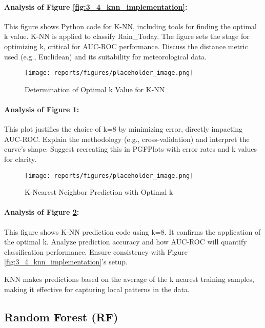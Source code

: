 \documentclass[12pt]{article}
\begin{document}
\paragraph{Analysis of Figure \ref{fig:3_4_knn_implementation}:}
This figure shows Python code for K-NN, including tools for finding the optimal k value. K-NN is applied to classify Rain\_Today. The figure sets the stage for optimizing k, critical for AUC-ROC performance. Discuss the distance metric used (e.g., Euclidean) and its suitability for meteorological data.

\begin{figure}[H]
    \centering
    \texttt{[image: reports/figures/placeholder\_image.png]} %
    \caption{Determination of Optimal k Value for K-NN}
    \label{fig:3_5_knn_optimal_k}
\end{figure}

\paragraph{Analysis of Figure \ref{fig:3_5_knn_optimal_k}:}
This plot justifies the choice of k=8 by minimizing error, directly impacting AUC-ROC. Explain the methodology (e.g., cross-validation) and interpret the curve’s shape. Suggest recreating this in PGFPlots with error rates and k values for clarity.

\begin{figure}[H]
    \centering
    \texttt{[image: reports/figures/placeholder\_image.png]} %
    \caption{K-Nearest Neighbor Prediction with Optimal k}
    \label{fig:3_6_knn_prediction_optimal_k}
\end{figure}

\paragraph{Analysis of Figure \ref{fig:3_6_knn_prediction_optimal_k}:}
This figure shows K-NN prediction code using k=8. It confirms the application of the optimal k. Analyze prediction accuracy and how AUC-ROC will quantify classification performance. Ensure consistency with Figure \ref{fig:3_4_knn_implementation}’s setup.

KNN makes predictions based on the average of the k nearest training samples, making it effective for capturing local patterns in the data.

\subsection{Random Forest (RF)}
\label{subsec:rf}
\end{document}

